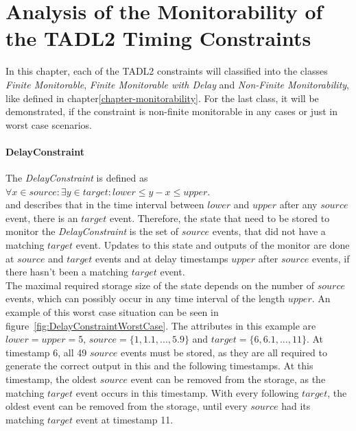 \chapter{Analysis of the Monitorability of the TADL2 Timing Constraints}
\label{chapter-TADL2}

In this chapter, each of the TADL2 constraints will classified into the classes \emph{Finite Monitorable}, \emph{Finite Monitorable with Delay} and \emph{Non-Finite Monitorability}, like defined in chapter\ref{chapter-monitorability}. For the last class, it will be demonstrated, if the constraint is non-finite monitorable in any cases or just in worst case scenarios.

\subsubsection{DelayConstraint}
	\label{monitorability_DelayConstraint}
	The \emph{DelayConstraint} is defined as\\[10pt]
	\begin{math}
		\forall x\in source:\exists y\in target: lower\leq y-x\leq upper.
	\end{math}\\[10pt]
	and describes that in the time interval between $lower$ and $upper$ after any $source$ event, there is an $target$ event. Therefore, the state that need to be stored to monitor the \emph{DelayConstraint} is the set of $source$ events, that did not have a matching $target$ event. Updates to this state and outputs of the monitor are done at $source$ and $target$ events and at delay timestamps $upper$ after $source$ events, if there hasn't been a matching $target$ event.\\
	The maximal required storage size of the state depends on the number of $source$ events, which can possibly occur in any time interval of the length $upper$. An example of this worst case situation can be seen in figure~\ref{fig:DelayConstraintWorstCase}. The attributes in this example are $lower=upper=5$, $source=\{1, 1.1, ..., 5.9\}$ and $target=\{6, 6.1, ..., 11\}$. At timestamp 6, all 49 $source$ events must be stored, as they are all required to generate the correct output in this and the following timestamps. At this timestamp, the oldest $source$ event can be removed from the storage, as the matching $target$ event occurs in this timestamp. With every following $target$, the oldest event can be removed from the storage, until every $source$ had its matching $target$ event at timestamp 11.\\
